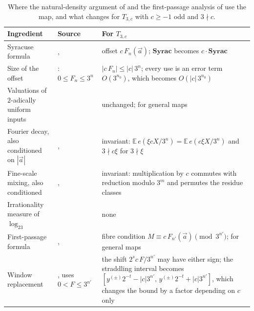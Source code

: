 \documentclass[12pt]{amsart}
\theoremstyle{definition}
\theoremstyle{remark}
\begin{document}
\begin{table}[htbp]
\centering
\footnotesize
\setlength{\tabcolsep}{3pt}
\renewcommand{\arraystretch}{1.15}
\begin{tabular}{@{}P{0.25\textwidth}P{0.27\textwidth}P{0.44\textwidth}@{}}
\toprule
\textbf{Ingredient} & \textbf{Source} & \textbf{For $T_{3,c}$} \\
\midrule
Syracuse formula & \cite[(1.7)]{Tao_2022}, \cite[(1)]{Allikvere_2026} & offset $c\,F_n(\vec a)$; $\mathbf{Syrac}$ becomes $c\cdot\mathbf{Syrac}$ \\
Size of the offset & \cite[(1.13)]{Tao_2022}: $0\le F_n\le3^n$ & $|c\,F_n|\le|c|\,3^n$; every use is an error term $O(3^{n_0})$, which becomes $O(|c|\,3^{n_0})$ \\
Valuations of $2$-adically uniform inputs & \cite[Proposition~1.9, Lemma~2.1]{Tao_2022} & unchanged; for general maps \cite[Proposition~3.1, Lemmas~3.2, 3.3]{GGM_2025} \\
Fourier decay, also conditioned on $|\vec a|$ & \cite[Proposition~1.17]{Tao_2022}, \cite[Theorem~3.1]{Allikvere_2026} & invariant: $\mathbb E\,e(\xi c X/3^n)=\mathbb E\,e(c\xi X/3^n)$ and $3\nmid c\xi$ for $3\nmid\xi$ \\
Fine-scale mixing, also conditioned & \cite[Proposition~1.14]{Tao_2022}, \cite[Theorem~4.1--Corollary~4.4]{Allikvere_2026} & invariant: multiplication by $c$ commutes with reduction modulo $3^m$ and permutes the residue classes \\
Irrationality measure of $\log_23$ & \cite[Lemmas~5.1, 5.2, Section~6.3]{Allikvere_2026} & none \\
First-passage formula & \cite[Proposition~5.2, (5.12)--(5.21)]{Tao_2022}, \cite[Proposition~6.2, Section~6.2]{Allikvere_2026} & fibre condition $M\equiv c\,F_{n'}(\vec a)\pmod{3^{n'}}$; for general maps \cite[proof of Proposition~3.5]{GGM_2025} \\
Window replacement & \cite[Lemma~6.4]{Allikvere_2026}, uses $0<F\le3^{n'}$ & the shift $2^sc\,F/3^{n'}$ may have either sign; the straddling interval becomes $[y^{(\pm)}2^{-t}-|c|3^{n'},\,y^{(\pm)}2^{-t}+|c|3^{n'}]$, which changes the bound by a factor depending on $c$ only \\
\bottomrule
\end{tabular}
\caption{Where the natural-density argument of \cite{Allikvere_2026} and the first-passage analysis of \cite{Tao_2022} use the map, and what changes for $T_{3,c}$ with $c\ge-1$ odd and $3\nmid c$.}
\label{table:transfer}
\end{table}
\end{document}
